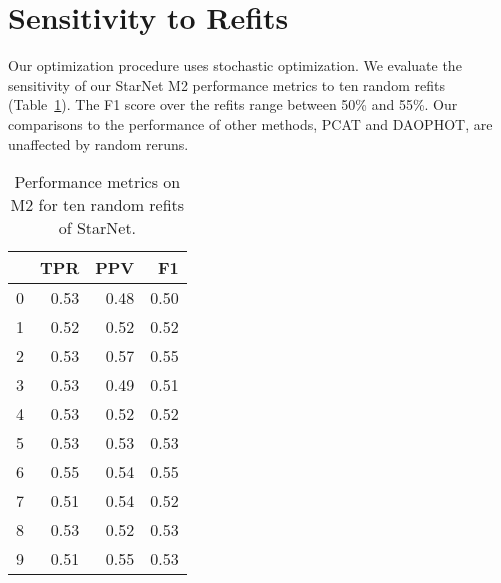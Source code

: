 \section{Sensitivity to Refits}
\label{sec:refits}

Our optimization procedure uses stochastic optimization. 
We evaluate the sensitivity of our StarNet M2 performance metrics to ten random refits (Table~\ref{tab:refits}). 
The F1 score over the refits range
between 50\% and 55\%. Our comparisons 
to the performance of other methods, PCAT and DAOPHOT, 
are unaffected by random reruns. 

\begin{table}
\centering
\begin{tabular}{lrrr}
\toprule
 &       TPR &       PPV &        F1 \\
\midrule
0 &  0.53 &  0.48 &  0.50 \\
1 &  0.52 &  0.52 &  0.52 \\
2 &  0.53 &  0.57 &  0.55 \\
3 &  0.53 &  0.49 &  0.51 \\
4 &  0.53 &  0.52 &  0.52 \\
5 &  0.53 &  0.53 &  0.53 \\
6 &  0.55 &  0.54 &  0.55 \\
 7 &  0.51 &  0.54 &  0.52 \\
8 &  0.53 &  0.52 &  0.53 \\
9 &  0.51 &  0.55 &  0.53 \\
\bottomrule
\end{tabular}
\caption{Performance metrics on M2 for ten random refits of StarNet. }
\label{tab:refits}
\end{table}
